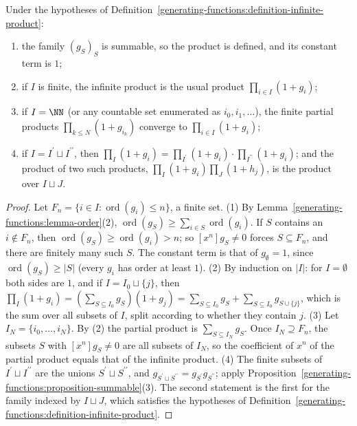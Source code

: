 \begin{proposition}\label{generating-functions:proposition-infinite-product}
Under the hypotheses of Definition~\ref{generating-functions:definition-infinite-product}:
\begin{enumerate}
\item the family $(g_S)_S$ is summable, so the product is defined, and its constant term is $1$;
\item if $I$ is finite, the infinite product is the usual product $\prod_{i \in I}(1 + g_i)$;
\item if $I = \NN$ (or any countable set enumerated as $i_0, i_1, \ldots$), the finite partial products $\prod_{k \leq N}(1 + g_{i_k})$ converge to $\prod_{i \in I}(1 + g_i)$;
\item if $I = I^{\prime} \sqcup I^{\prime\prime}$, then $\prod_I(1 + g_i) = \prod_{I^{\prime}}(1 + g_i) \cdot \prod_{I^{\prime\prime}}(1 + g_i)$; and the product of two such products,
$\prod_I(1 + g_i)\prod_J(1 + h_j)$, is the product over $I \sqcup J$.
\end{enumerate}
\end{proposition}

\begin{proof}
Let $F_n = \{i \in I : \operatorname{ord}(g_i) \leq n\}$, a finite set.
(1) By Lemma~\ref{generating-functions:lemma-order}(2), $\operatorname{ord}(g_S) \geq \sum_{i \in S}\operatorname{ord}(g_i)$. If $S$ contains an $i \notin F_n$, then $\operatorname{ord}(g_S) \geq \operatorname{ord}(g_i) > n$;
so $[x^n]g_S \neq 0$ forces $S \subseteq F_n$, and there are finitely many such $S$. The constant term is that of $g_\emptyset = 1$, since $\operatorname{ord}(g_S) \geq |S|$ (every $g_i$ has order at
least $1$).
(2) By induction on $|I|$: for $I = \emptyset$ both sides are $1$, and if $I = I_0 \sqcup \{j\}$, then $\prod_I(1 + g_i) = (\sum_{S \subseteq I_0}g_S)(1 + g_j) = \sum_{S \subseteq I_0}g_S +
\sum_{S \subseteq I_0}g_{S \cup \{j\}}$, which is the sum over all subsets of $I$, split according to whether they contain $j$.
(3) Let $I_N = \{i_0, \ldots, i_N\}$. By (2) the partial product is $\sum_{S \subseteq I_N}g_S$. Once $I_N \supseteq F_n$, the subsets $S$ with $[x^n]g_S \neq 0$ are all subsets of $I_N$, so the
coefficient of $x^n$ of the partial product equals that of the infinite product.
(4) The finite subsets of $I^{\prime} \sqcup I^{\prime\prime}$ are the unions $S^{\prime} \sqcup S^{\prime\prime}$, and $g_{S^{\prime} \sqcup S^{\prime\prime}} = g_{S^{\prime}}g_{S^{\prime\prime}}$; apply
Proposition~\ref{generating-functions:proposition-summable}(3). The second statement is the first for the family indexed by $I \sqcup J$, which satisfies the hypotheses of
Definition~\ref{generating-functions:definition-infinite-product}.
\end{proof}

